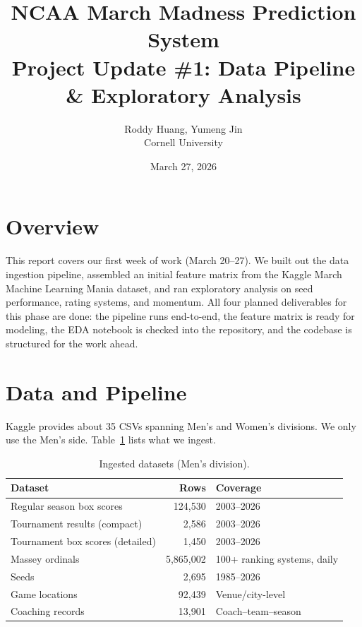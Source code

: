 \documentclass[11pt,a4paper]{article}
\title{%
    \vspace{-1cm}
    {\LARGE\bfseries NCAA March Madness Prediction System}\\[6pt]
    {\large Project Update \#1: Data Pipeline \& Exploratory Analysis}
}
\author{
    Roddy Huang, Yumeng Jin \\
    Cornell University
}
\date{March 27, 2026}
\begin{document}
\maketitle
\thispagestyle{fancy}

\section{Overview}

This report covers our first week of work (March 20--27). We built out the data ingestion pipeline, assembled an initial feature matrix from the Kaggle March Machine Learning Mania dataset, and ran exploratory analysis on seed performance, rating systems, and momentum. All four planned deliverables for this phase are done: the pipeline runs end-to-end, the feature matrix is ready for modeling, the EDA notebook is checked into the repository, and the codebase is structured for the work ahead.


\section{Data and Pipeline}

Kaggle provides about 35 CSVs spanning Men's and Women's divisions. We only use the Men's side. Table~\ref{tab:data-summary} lists what we ingest.

\begin{table}[h]
\centering
\caption{Ingested datasets (Men's division).}
\label{tab:data-summary}
\small
\begin{tabular}{@{}lrl@{}}
\toprule
\textbf{Dataset} & \textbf{Rows} & \textbf{Coverage} \\
\midrule
Regular season box scores & 124,530 & 2003--2026 \\
Tournament results (compact) & 2,586 & 2003--2026 \\
Tournament box scores (detailed) & 1,450 & 2003--2026 \\
Massey ordinals & 5,865,002 & 100+ ranking systems, daily \\
Seeds & 2,695 & 1985--2026 \\
Game locations & 92,439 & Venue/city-level \\
Coaching records & 13,901 & Coach--team--season \\
\bottomrule
\end{tabular}
\end{table}
\end{document}
